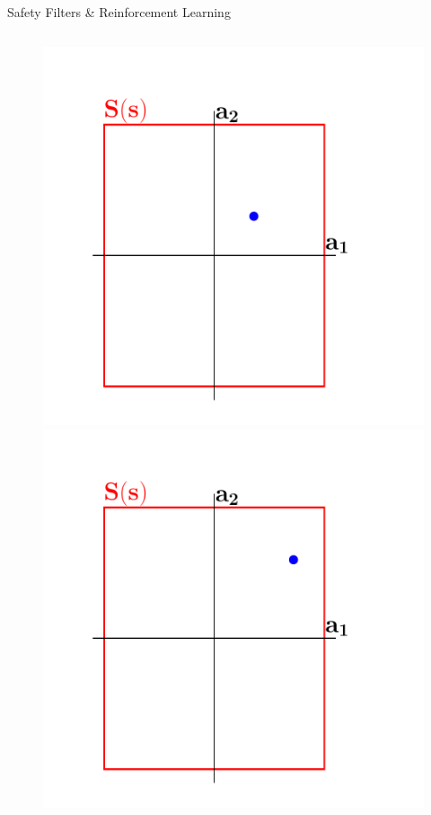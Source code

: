 \documentclass[lecture]{beamer}
\begin{document}
\begin{frame}{\normalsize Safety Filters \& Reinforcement Learning}
\begin{columns}[t]
\begin{overlayarea}{\textwidth}{.5\textheight}
\begin{figure}
{	}
	      \only<8>
        {
        \center
	\includegraphics[width=1\textwidth,clip]{Codes/SafetyFilters/Projection5.pdf}
	}
	      \only<9>
        {
        \center
	\includegraphics[width=1\textwidth,clip]{Codes/SafetyFilters/Projection6.pdf}
}
\end{figure}
\end{overlayarea}
\end{columns}
\end{frame}
\end{document}
